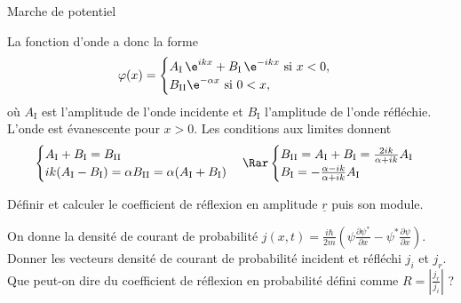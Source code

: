 \begin{exo}[PC][2][colle]{Marche de potentiel}
\begin{quest}
{  La fonction d'onde a donc la forme
  \begin{equation*}
  \varphi(x)=\begin{cases}
  A_\mathrm{I}\,\e^{ikx}+B_\mathrm{I}\,\e^{-ikx} \text{ si } x<0, \\
  B_\mathrm{II}\e^{-\alpha x} \text{ si } 0<x, \\
  \end{cases}
  \end{equation*}
  où $A_\mathrm{I}$ est l'amplitude de l'onde incidente et $B_\mathrm{I}$ l'amplitude de l'onde réfléchie. L'onde est évanescente pour $x>0$. Les conditions aux limites donnent
  \begin{equation*}
  \begin{cases}
  A_\mathrm{I}+B_\mathrm{I} = B_\mathrm{II} \\
  ik (A_\mathrm{I}-B_\mathrm{I}) =  \alpha B_\mathrm{II} =  \alpha(A_\mathrm{I}+B_\mathrm{I}) \\
  \end{cases} \Rar
  \begin{cases}
  B_\mathrm{II} = A_\mathrm{I}+B_\mathrm{I} =  \frac{2ik }{\alpha+ik}  A_\mathrm{I}  \\
  B_\mathrm{I} =  -\frac{\alpha-ik }{\alpha+ik}  A_\mathrm{I} \\
  \end{cases}
  \end{equation*}
  }
  \item Définir et calculer le coefficient de réflexion en amplitude $\underline{r}$ puis son module.
  \item On donne la densité de courant de probabilité $j(x, t)=\frac{i \hbar}{2 m}\left(\psi \frac{\partial \psi^*}{\partial x}-\psi^* \frac{\partial \psi}{\partial x}\right)$. Donner les vecteurs densité de courant de probabilité incident et réfléchi $j_i$ et $j_r$. Que peut-on dire du coefficient de réflexion en probabilité défini comme $R=\left|\frac{j_r}{j_i}\right|$ ?
\end{quest}
\end{exo}
